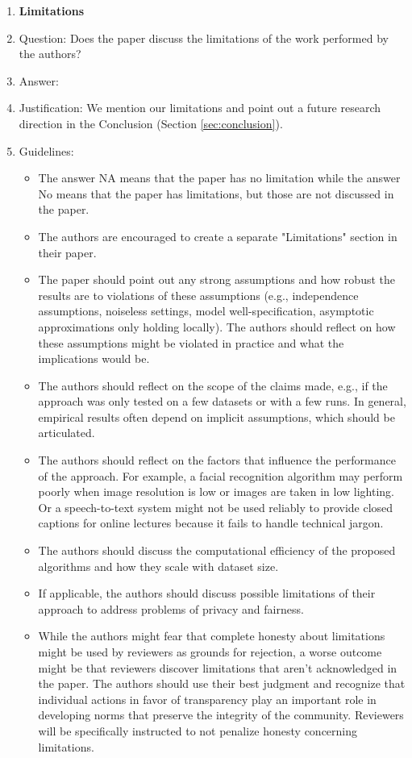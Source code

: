 \documentclass{article}
\theoremstyle{plain}
\theoremstyle{definition}
\theoremstyle{remark}
\begin{document}
\begin{enumerate}
\item {\bf Limitations}
    \item[] Question: Does the paper discuss the limitations of the work performed by the authors?
    \item[] Answer: \answerYes{} %
    \item[] Justification: We mention our limitations and point out a future research direction in the Conclusion (Section \ref{sec:conclusion}). 
    \item[] Guidelines:
    \begin{itemize}
        \item The answer NA means that the paper has no limitation while the answer No means that the paper has limitations, but those are not discussed in the paper. 
        \item The authors are encouraged to create a separate "Limitations" section in their paper.
        \item The paper should point out any strong assumptions and how robust the results are to violations of these assumptions (e.g., independence assumptions, noiseless settings, model well-specification, asymptotic approximations only holding locally). The authors should reflect on how these assumptions might be violated in practice and what the implications would be.
        \item The authors should reflect on the scope of the claims made, e.g., if the approach was only tested on a few datasets or with a few runs. In general, empirical results often depend on implicit assumptions, which should be articulated.
        \item The authors should reflect on the factors that influence the performance of the approach. For example, a facial recognition algorithm may perform poorly when image resolution is low or images are taken in low lighting. Or a speech-to-text system might not be used reliably to provide closed captions for online lectures because it fails to handle technical jargon.
        \item The authors should discuss the computational efficiency of the proposed algorithms and how they scale with dataset size.
        \item If applicable, the authors should discuss possible limitations of their approach to address problems of privacy and fairness.
        \item While the authors might fear that complete honesty about limitations might be used by reviewers as grounds for rejection, a worse outcome might be that reviewers discover limitations that aren't acknowledged in the paper. The authors should use their best judgment and recognize that individual actions in favor of transparency play an important role in developing norms that preserve the integrity of the community. Reviewers will be specifically instructed to not penalize honesty concerning limitations.
    \end{itemize}


\end{enumerate}
\end{document}
